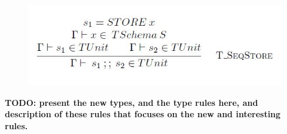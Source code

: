 \begin{figure}
  \includegraphics[width=1\linewidth]{Images/SEQ2.JPG}
  \label{fig:seq2}
\end{figure}


{\bf TODO: present the new types, and the type rules here, and description of 
these rules that focuses on the new and interesting rules.}

